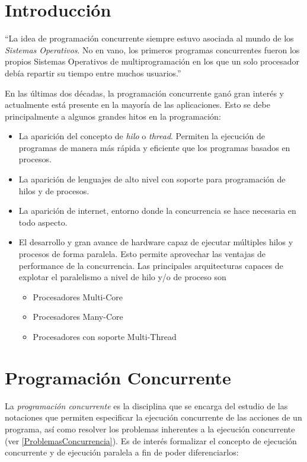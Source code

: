 \section{Introducción}
\label{IntroduccionConcurrencia}

``La idea de programación concurrente siempre estuvo asociada al mundo de los
\textit{Sistemas Operativos}. No en vano, los primeros programas concurrentes
fueron los propios Sistemas Operativos de multiprogramación en los que un solo
procesador debía repartir su tiempo entre muchos usuarios.''\cite{PalmaConcurrente}

En las últimas dos décadas, la programación concurrente ganó gran interés y
actualmente está presente en la mayoría de las aplicaciones.
Esto se debe principalmente a algunos grandes hitos en la programación:
\begin{itemize}
	\item La aparición del concepto de \textit{hilo} o \textit{thread}. Permiten la
	ejecución de programas de manera más rápida y eficiente que los programas
	basados en procesos.
	\item La aparición de lenguajes de alto nivel con soporte para
	programación de hilos y de procesos.
	\item La aparición de internet, entorno donde la concurrencia se hace necesaria
	en todo aspecto.
	\item El desarrollo y gran avance de hardware capaz de ejecutar múltiples hilos
	y procesos de forma paralela. Esto permite aprovechar las ventajas de
	performance de la concurrencia. Las principales arquitecturas capaces de
	explotar el paralelismo a nivel de hilo y/o de proceso son
	\begin{itemize}
	    \item Procesadores Multi-Core
	    \item Procesadores Many-Core
	    \item Procesadores con soporte Multi-Thread
    \end{itemize}
\end{itemize}

\section{Programación Concurrente}
\label{ProgramacionConcurrente}

La \textit{programación concurrente} es la disciplina que se encarga del estudio
de las notaciones que permiten especificar la ejecución concurrente de las
acciones de un programa, así como resolver los problemas inherentes a la
ejecución concurrente (ver \ref{ProblemasConcurrencia}). Es de interés
formalizar el concepto de ejecución concurrente y de ejecución paralela a fin
de poder diferenciarlos:

